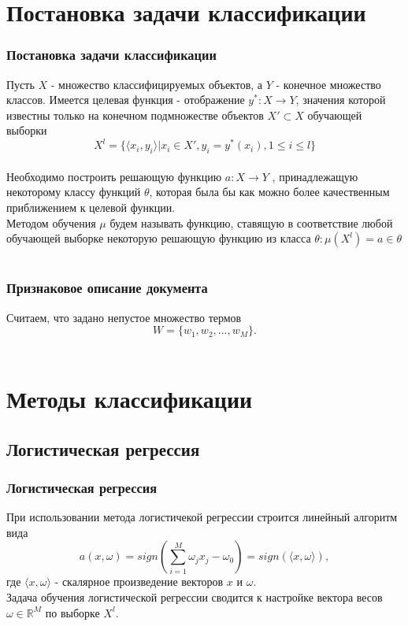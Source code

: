 \documentclass{beamer}
\begin{document}
\section{Постановка задачи классификации}
\begin{frame}
\frametitle{Постановка задачи классификации}
Пусть $X$ - множество классифицируемых объектов, а $Y$ - конечное множество классов. Имеется целевая функция - отображение $y^*:X\rightarrow Y$, значения которой известны только на конечном подмножестве объектов $X' \subset X$ обучающей выборки \\
$$X^l=\{\langle x_i,y_i \rangle |x_i \in X', y_i=y^*(x_i),1\le i \le l\}$$
\\Необходимо построить решающую функцию $a: X \rightarrow Y$ , принадлежащую
некоторому классу функций $\theta$, которая была бы как можно более качественным
приближением к целевой функции. 
\\Методом обучения $\mu$ будем называть функцию, ставящую в соответствие любой обучающей выборке некоторую
решающую функцию из класса $\theta: \mu(X^l)=a \in \theta$
\end{frame}

\section{}
\begin{frame}
\frametitle{Признаковое описание документа}
Считаем, что задано непустое множество термов $$W=\{w_1,w_2,...,w_M\}.$$\\

\end{frame}

\section{Методы классификации}
\subsection{Логистическая регрессия}
\begin{frame}
\frametitle{Логистическая регрессия}
При использовании метода логистичекой регрессии строится линейный алгоритм вида
$$a(x,\omega)=sign\left(\sum\limits_{i=1}^M\omega_j x_j-\omega_0\right)=sign\left(\langle x,\omega \rangle\right),$$ где $\langle x,\omega \rangle$ - скалярное произведение векторов $x$ и $\omega$.
\newline
\\Задача обучения логистической регрессии сводится к настройке вектора весов $\omega\in \mathbb{R}^M$ по выборке $X^l$.
\end{frame}
\end{document}

